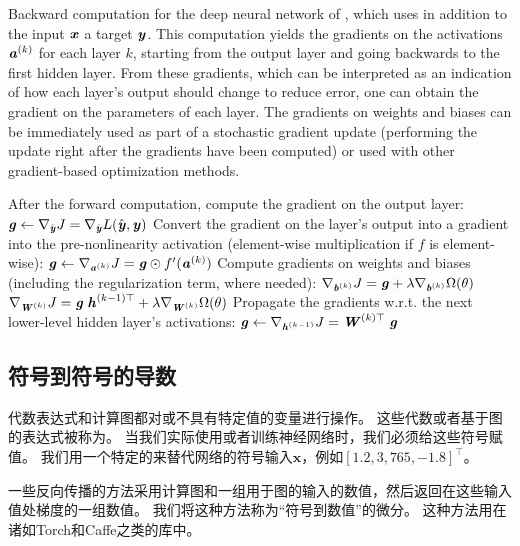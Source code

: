 \begin{algorithm}[htpb]
\caption{Backward computation for the deep neural network
of , which uses in addition to the
input $\boldsymbol{\mathit{x}}$ a target $\boldsymbol{\mathit{y}}$. This computation yields the
gradients on the activations $\boldsymbol{\mathit{a}}^{(k)}$ for each layer $k$,
starting from the output layer and going backwards to the first
hidden layer. From these gradients, which can be interpreted as
an indication of how each layer's output should change to reduce
error, one can obtain the gradient on the parameters of each layer.
The gradients on weights and biases can be immediately used
as part of a stochastic gradient update (performing the
update right after the gradients have been computed) or used with other
gradient-based optimization methods.
}
\label{alg:mlp-bprop}
\begin{algorithmic}
\STATE After the forward computation, compute the gradient on the output layer:
\STATE $\boldsymbol{\mathit{g}} \leftarrow \nabla_{\hat{\boldsymbol{\mathit{y}}}} J = \nabla_{\hat{\boldsymbol{\mathit{y}}}} L(\hat{\boldsymbol{\mathit{y}}},\boldsymbol{\mathit{y}})$
\STATE Convert the gradient on the layer's output into a gradient into the pre-nonlinearity activation
       (element-wise multiplication if $f$ is element-wise):
  \STATE $\boldsymbol{\mathit{g}} \leftarrow \nabla_{\boldsymbol{\mathit{a}}^{(k)}} J = \boldsymbol{\mathit{g}} \odot f'(\boldsymbol{\mathit{a}}^{(k)})$
  \STATE Compute gradients on weights and biases (including the regularization term, where needed):
  \STATE $\nabla_{\boldsymbol{\mathit{b}}^{(k)}} J = \boldsymbol{\mathit{g}} + \lambda \nabla_{\boldsymbol{\mathit{b}}^{(k)}} \Omega(\theta)$
  \STATE $\nabla_{\boldsymbol{\mathit{W}}^{(k)}} J = \boldsymbol{\mathit{g}} \; \boldsymbol{\mathit{h}}^{(k-1)\top} + \lambda \nabla_{\boldsymbol{\mathit{W}}^{(k)}} \Omega(\theta)$
  \STATE Propagate the gradients w.r.t. the next lower-level hidden layer's activations:
  \STATE $\boldsymbol{\mathit{g}} \leftarrow \nabla_{\boldsymbol{\mathit{h}}^{(k-1)}} J = \boldsymbol{\mathit{W}}^{(k)\top} \; \boldsymbol{\mathit{g}}$
\ENDFOR
\end{algorithmic}
\end{algorithm}



\subsection{符号到符号的导数}
\label{sec:symbol_to_symbol_derivatives}

代数表达式和计算图都对或不具有特定值的变量进行操作。
这些代数或者基于图的表达式被称为。
当我们实际使用或者训练神经网络时，我们必须给这些符号赋值。
我们用一个特定的来替代网络的符号输入$\bm{x}$，例如$[1.2, 3,765, -1.8]^\top$。

一些反向传播的方法采用计算图和一组用于图的输入的数值，然后返回在这些输入值处梯度的一组数值。
我们将这种方法称为``符号到数值''的微分。
这种方法用在诸如Torch\citep{Torch-2011}和Caffe\citep{Jia13caffe}之类的库中。

